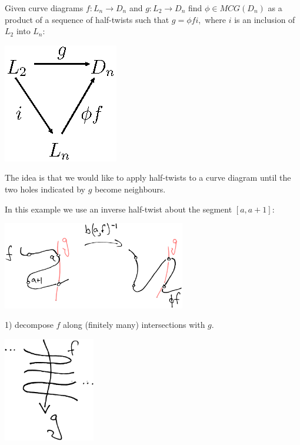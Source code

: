 \documentclass[12pt,a4paper]{article}
\begin{document}
Given curve diagrams $f:L_n\to D_n$ and $g:L_2\to D_n$
find $\phi\in MCG(D_n)$ as a product of
a sequence of half-twists such that
$g = \phi f i,$ where $i$ is an inclusion of $L_2$ into $L_n:$

\begin{center}
\includegraphics{halftwist-factor.eps}
\end{center}

The idea is that we would like to apply half-twists to a curve diagram
until the two holes indicated by $g$ become neighbours.


In this example we use an inverse half-twist about the segment $[a, a+1]:$

\begin{center}
\includegraphics[width=0.6\textwidth]{example-problem-1.eps}
\end{center}



1) decompose $f$ along (finitely many) intersections
with $g.$

\begin{center}
\includegraphics[width=0.3\textwidth]{snake-decompose.eps}
\end{center}
\end{document}
